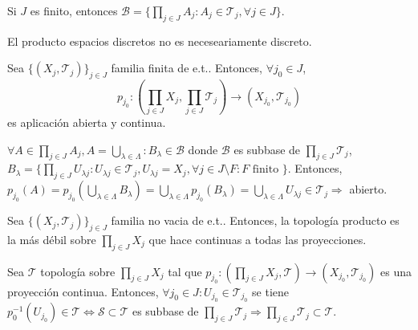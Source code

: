 \begin{obs}
  Si $J$ es finito, entonces $ \mathcal{B} = \big\{ \prod_{j \in J} A_{j}: A_{j} \in \mathcal{T}_{j}, \forall j \in J \big\}$.
\end{obs}

\begin{obs}
  El producto espacios discretos no es neceseariamente discreto.
\end{obs}

\begin{prop}
  Sea $\{( X_{j}, \mathcal{T}_{j} )\}_{j \in J}$ familia finita de e.t.. Entonces, $\forall j_{0} \in J$, 
  \[ 
    p_{j_{0}}: ( \prod_{j \in J} X_{j}, \prod_{j \in J} \mathcal{T}_{j} ) \to ( X_{j_{0}}, \mathcal{T}_{j_{0}} )
  \] 
  es aplicación abierta y continua.
\end{prop}

\begin{dem}
  $\forall A \in \prod_{j \in J} A_{j}, A = \bigcup_{\lambda \in \Lambda} : B_{\lambda} \in \mathcal{B}$ donde $\mathcal{B}$ es subbase de $\prod_{j \in J} \mathcal{T}_{j}$, $B_{\lambda} = \{ \prod_{j \in J} U_{\lambda j}: U_{\lambda j} \in \mathcal{T}_{j}, U_{\lambda j} = X_{j}, \forall j \in J \setminus F: F \text{ finito }\}$. Entonces, $p_{j_{0}}(A) = p_{j_{0}}(\bigcup_{\lambda \in \Lambda} B_{\lambda}) = \bigcup_{\lambda \in \Lambda} p_{j_{0}}(B_{\lambda}) = \bigcup_{\lambda \in \Lambda} U_{\lambda j} \in \mathcal{T}_{j} \Rightarrow $ abierto.
\end{dem}

\begin{prop}
  Sea $\{ ( X_{j}, \mathcal{T}_{j} ) \}_{j \in J}$ familia no vacia de e.t.. Entonces, la topología producto es la más débil sobre $\prod_{j \in J} X_{j}$ que hace continuas a todas las proyecciones.
\end{prop}

\begin{dem}
  Sea $\mathcal{T}$ topología sobre $ \prod_{j \in J} X_{j}$ tal que $p_{j_{0}}: ( \prod_{j \in J} X_{j}, \mathcal{T} ) \to ( X_{j_{0}}, \mathcal{T}_{j_{0}} )$ es una proyección continua. Entonces, $\forall j_{0} \in J: U_{j_{0}} \in \mathcal{T}_{j_{0}}$ se tiene $p_{0}^{-1}(U_{j_{0}}) \in \mathcal{T} \Leftrightarrow \mathcal{S} \subset \mathcal{T}$ es subbase de $\prod_{j \in J} \mathcal{T}_{j} \Rightarrow \prod_{j \in J} \mathcal{T}_{j} \subset \mathcal{T}$.
\end{dem}
